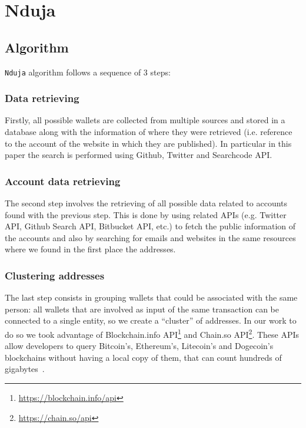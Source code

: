 \newcommand{\walletcollector}{\texttt{wallet\_collector}}
\newcommand{\userinforetriever}{\texttt{user\_info\_retriever}}
\newcommand{\addresschecker}{\texttt{address\_checker}}
\newcommand{\graph}{\texttt{graph}}

\section{Nduja} \label{nduja}

\subsection{Algorithm}
\texttt{Nduja} algorithm follows a sequence of 3 steps:
\subsubsection*{Data retrieving} Firstly, all possible wallets are collected
from multiple sources and stored in a database along with the
information of where they were retrieved (i.e. reference to the account of the
website in which they are published). In particular in this paper the search is
performed using Github, Twitter and Searchcode API.

\subsubsection*{Account data retrieving} The second step involves the
retrieving of all possible data related to accounts found with the previous
step. This is done by using related APIs (e.g. Twitter API, Github Search API,
Bitbucket API, etc.) to fetch the public information of the accounts and also
by searching for emails and websites in the same resources where we found in
the first place the addresses.

\subsubsection*{Clustering addresses} The last step consists in grouping
wallets that could be associated with the same person: all wallets that are
involved as input of the same transaction can be connected to a single
entity, so we create a ``cluster'' of addresses. In our work to do so we
took advantage of
Blockchain.info API\footnote{\url{https://blockchain.info/api}} and
Chain.so API\footnote{\url{https://chain.so/api}}. These APIs allow
developers to query Bitcoin's, Ethereum's, Litecoin's and Dogecoin's
blockchains without having a local copy of them, that can count
hundreds of gigabytes~\cite{bib:bitinfochart}.

